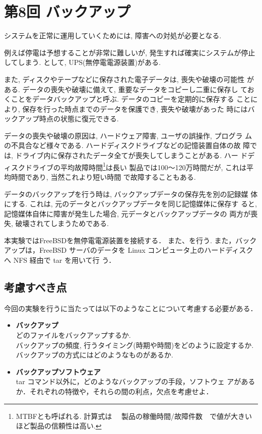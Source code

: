 \section{第8回 バックアップ}
システムを正常に運用していくためには, 障害への対処が必要となる. 

例えば停電は予想することが非常に難しいが, 発生すれば確実にシステムが停止してしまう. 
\textbf{}として, UPS(無停電電源装置)がある. 

また, ディスクやテープなどに保存された電子データは, 喪失や破壊の可能性
がある. データの喪失や破壊に備えて, 重要なデータをコピーし二重に保存し
ておくことをデータバックアップと呼ぶ. データのコピーを定期的に保存する
ことにより, 保存を行った時点までのデータを保護でき, 喪失や破壊があった
時にはバックアップ時点の状態に復元できる.

データの喪失や破壊の原因は, ハードウェア障害, ユーザの誤操作, プログラ
ムの不具合など様々である. ハードディスクドライブなどの記憶装置自体の故
障では, ドライブ内に保存されたデータ全てが喪失してしまうことがある. ハー
ドディスクドライブの平均故障時間\footnote{MTBFとも呼ばれる. 計算式は　
  製品の稼働時間/故障件数　で値が大きいほど製品の信頼性は高い. }は長い
製品では100〜120万時間だが, これは平均時間であり, 当然これより短い時間
で故障することもある.

データのバックアップを行う時は, バックアップデータの保存先を別の記録媒
体にする. これは, 元のデータとバックアップデータを同じ記憶媒体に保存す
ると, 記憶媒体自体に障害が発生した場合, 元データとバックアップデータの
両方が喪失, 破壊されてしまうためである.

本実験ではFreeBSDを無停電電源装置を接続する．
また、\textbf{}を行う. また，バックアップは，FreeBSD サーバのデータを 
    Linux コンピュータ上のハードディスクへ NFS 経由で tar を用いて行
    う．

\subsection*{考慮すべき点}
今回の実験を行うに当たっては以下のようなことについて考慮する必要がある．
\begin{itemize}
  \item \textbf{バックアップ}\\
         どのファイルをバックアップするか. \\
         バックアップの頻度, 行うタイミング(時期や時間)をどのように設定するか. \\
         バックアップの方式にはどのようなものがあるか. 

       \item \textbf{バックアップソフトウェア}\\
         tar コマンド以外に，どのようなバックアップの手段，ソフトウェ
         アがあるか．それぞれの特徴や，それらの間の利点，欠点を考慮せよ．
         
\end{itemize}
